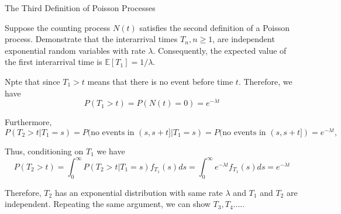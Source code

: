 \documentclass{beamer}
\begin{document}
\begin{frame}{The Third Definition of Poisson Processes}


    {\footnotesize \footnotesize
    \par Suppose the counting process \( N(t) \) satisfies the second definition of a Poisson process. 
    Demonstrate that the interarrival times \( T_n,  n \geq 1 \), are independent exponential 
    random variables with rate \(\lambda\). 
    Consequently, the expected value of the first interarrival time is \( \mathbb{E}[T_1] = 1/\lambda \).
    \vspace{1em}\pause
    \par [Proof]
    \par Npte that since \( T_1 > t \) means that there is no event before time \( t \). Therefore, we have  
        \[
        P(T_1 > t) = P(N(t) = 0) = e^{-\lambda t}
        \]  
    \par\pause Furthermore,  
    \[
    P(T_2 > t|T_1 = s) = P(\text{no events in } (s, s + t]|T_1 = s) = P(\text{no events in } (s, s + t]) = e^{-\lambda t},
    \]  
    \par Thus, conditioning on \( T_1 \) we have  
    \[
    P(T_2 > t) = \int_{0}^{\infty} P(T_2 > t|T_1 = s)f_{T_1}(s)ds = \int_{0}^{\infty} e^{-\lambda t}f_{T_1}(s)ds
     =  e^{-\lambda t}
    \]  
     \par \pause Therefore, \( T_2 \) has an exponential distribution with same rate $\lambda$ and  \( T_1 \) and \( T_2 \) are independent.  
    Repeating the same argument, we can show $T_3, T_4.....$
    }
    
\end{frame}
\end{document}
